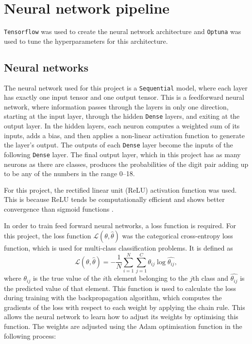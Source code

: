 \documentclass[11pt,a4paper]{article}
\begin{document}
\section{Neural network pipeline}
\texttt{Tensorflow} was used to create the neural network architecture and \texttt{Optuna} was used to tune the hyperparameters for this architecture.

\subsection{Neural networks}
The neural network used for this project is a \texttt{Sequential} model, where each layer has exactly one input tensor and one output tensor. This is a feedforward neural network, where information passes through the layers in only one direction, starting at the input layer, through the hidden \texttt{Dense} layers, and exiting at the output layer. In the hidden layers, each neuron computes a weighted sum of its inputs, adds a bias, and then applies a non-linear activation function to generate the layer's output. The outputs of each \texttt{Dense} layer become the inputs of the following \texttt{Dense} layer. The final output layer, which in this project has as many neurons as there are classes, produces the probabilities of the digit pair adding up to be any of the numbers in the range 0--18.

For this project, the rectified linear unit (ReLU) activation function was used. This is because ReLU tends be computationally efficient and shows better convergence than sigmoid functions \citep{Zeiler2013relu}.

In order to train feed forward neural networks, a loss function is required. For this project, the loss function $\mathcal{L} (\theta, \hat{\theta})$ was the categorical cross-entropy loss function, which is used for multi-class classification problems. It is defined as
\begin{equation}
    \mathcal{L}(\theta, \hat{\theta}) = - \frac{1}{N}\sum^N_{i=1}\sum^C_{j=1} \theta_{ij} \log{\hat{\theta_{ij}}},
    \label{eq:loss}
\end{equation}
where $\theta_{ij}$ is the true value of the $i$th element belonging to the $j$th class and $\hat{\theta_{ij}}$ is the predicted value of that element. This function is used to calculate the loss during training with the backpropagation algorithm, which computes the gradients of the loss with respect to each weight by applying the chain rule. This allows the neural network to learn how to adjust its weights by optimising this function. The weights are adjusted using the Adam optimisation function in the following process:
\end{document}

